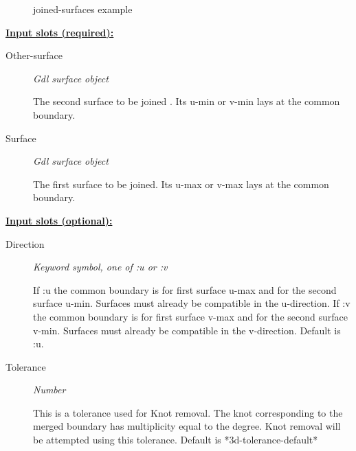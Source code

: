\documentclass [11pt]{book}
\begin{document}
\begin{itemize}
\begin{figure}
\caption{joined-surfaces example}

\label{fig:joined-surfaces}

\end{figure}





\textbf{
\underline{Input slots (required):}}

\begin{description}

\item [Other-surface]
\emph{Gdl surface object}

 The second surface to be joined . Its u-min or v-min lays at the common boundary.




\item [Surface]
\emph{Gdl surface object}

 The first surface to be joined. Its u-max or v-max lays at the common boundary.




\end{description}






\textbf{
\underline{Input slots (optional):}}

\begin{description}

\item [Direction]
\emph{Keyword symbol, one of :u or :v}

 If :u the common
boundary is for first surface u-max and for the second
surface u-min. Surfaces must already be compatible in
the u-direction. If :v the common boundary is for
first surface v-max and for the second surface
v-min. Surfaces must already be compatible in the
v-direction. Default is :u.




\item [Tolerance]
\emph{Number}

 This is a tolerance used for Knot removal.  The knot corresponding to the merged boundary has multiplicity equal to the degree. Knot removal will be attempted using this tolerance. Default is *3d-tolerance-default*




\end{description}








\end{itemize}
\end{document}
